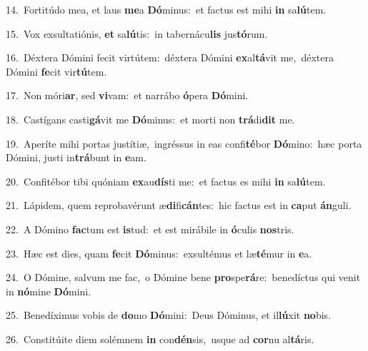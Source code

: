 {\numbfont\textcolor{\numbcolor}{14.}}~Fortitúdo mea, et laus \textbf{me}\-a \textbf{Dó}\-minus:~\star et factus est mihi \textbf{in} sa\-\textbf{lú}\-tem.\par
{\numbfont\textcolor{\numbcolor}{15.}}~Vox exsultatiónis, \textbf{et} sa\-\textbf{lú}\-tis:~\star in tabernácu\textbf{lis} jus\-\textbf{tó}\-rum.\par
{\numbfont\textcolor{\numbcolor}{16.}}~Déxtera Dómini fecit virtútem:~\dagger déxtera Dómini \textbf{ex}\-al\-\textbf{tá}\-vit me,~\star déxtera Dómini \textbf{fe}\-cit vir\-\textbf{tú}\-tem.\par
{\numbfont\textcolor{\numbcolor}{17.}}~Non móri\-\textbf{ar}\-, sed \textbf{vi}\-vam:~\star et narrábo \textbf{ó}\-pera \textbf{Dó}\-mini.\par
{\numbfont\textcolor{\numbcolor}{18.}}~Castígans casti\-\textbf{gá}\-vit me \textbf{Dó}\-minus:~\star et morti non \textbf{trá}\-di\textbf{dit} me.\par
{\numbfont\textcolor{\numbcolor}{19.}}~Aperíte mihi portas justítiæ,~\dagger ingréssus in eas confi\-\textbf{té}\-bor \textbf{Dó}\-mino:~\star hæc porta Dómini, justi in\-\textbf{trá}\-bunt in \textbf{e}\-am.\par
{\numbfont\textcolor{\numbcolor}{20.}}~Confitébor tibi quóniam \textbf{ex}\-au\-\textbf{dís}\-ti me:~\star et factus es mihi \textbf{in} sa\-\textbf{lú}\-tem.\par
{\numbfont\textcolor{\numbcolor}{21.}}~Lápidem, quem reprobavérunt æ\-\textbf{di}\-fi\-\textbf{cán}\-tes:~\star hic factus est in \textbf{ca}\-put \textbf{án}\-guli.\par
{\numbfont\textcolor{\numbcolor}{22.}}~A Dómino \textbf{fac}\-tum est \textbf{is}\-tud:~\star et est mirábile in \textbf{ó}\-culis \textbf{nos}\-tris.\par
{\numbfont\textcolor{\numbcolor}{23.}}~Hæc est dies, quam \textbf{fe}\-cit \textbf{Dó}\-minus:~\star exsultémus et læ\-\textbf{té}\-mur in \textbf{e}\-a.\par
{\numbfont\textcolor{\numbcolor}{24.}}~O Dómine, salvum me fac,~\dagger o Dómine bene \textbf{pro}\-spe\-\textbf{rá}\-re:~\star benedíctus qui venit in \textbf{nó}\-mine \textbf{Dó}\-mini.\par
{\numbfont\textcolor{\numbcolor}{25.}}~Benedíximus vobis de \textbf{do}\-mo \textbf{Dó}\-mini:~\star Deus Dóminus, et il\-\textbf{lú}\-xit \textbf{no}\-bis.\par
{\numbfont\textcolor{\numbcolor}{26.}}~Constitúite diem solémnem \textbf{in} con\-\textbf{dén}\-sis,~\star usque ad \textbf{cor}\-nu al\-\textbf{tá}\-ris.\par
